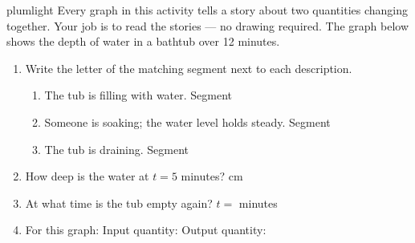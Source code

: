 \documentclass[10pt]{article}
\begin{document}

\vspace{0.12in}

\begin{scenariobox}{plumlight}
\small
Every graph in this activity tells a story about two quantities changing together.
Your job is to read the stories --- no drawing required. The graph below shows the
depth of water in a bathtub over 12 minutes.

\begin{center}
\end{center}
\end{scenariobox}

\vspace{0.1in}

\boxguard
\begin{tcolorbox}[colback=white, colframe=black!40,
    title=\textbf{Tier R --- Remediate},
    fonttitle=\bfseries, arc=2mm, left=3mm, right=3mm, top=2mm, bottom=2mm]

\begin{enumerate}[itemsep=8pt]
  \item Write the letter of the matching segment next to each description.

        \begin{enumerate}[label=(\alph*), itemsep=4pt]
          \item The tub is filling with water. \quad Segment 
          \item Someone is soaking; the water level holds steady. \quad Segment 
          \item The tub is draining. \quad Segment 
        \end{enumerate}

  \item How deep is the water at $t = 5$ minutes? \quad {} cm

  \item At what time is the tub empty again? \quad $t = $  minutes

  \item For this graph: \quad Input quantity:  \quad
        Output quantity: 
\end{enumerate}
\end{tcolorbox}
\end{document}
